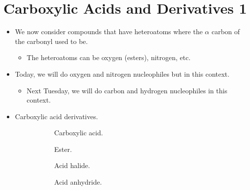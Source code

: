 \documentclass[../notes.tex]{subfiles}
\begin{document}
\section{Carboxylic Acids and Derivatives 1}
\begin{itemize}
    \item {}We now consider compounds that have heteroatoms where the $\alpha$ carbon of the carbonyl used to be.
    \begin{itemize}
        \item The heteroatoms can be oxygen (esters), nitrogen, etc.
    \end{itemize}
    \item Today, we will do oxygen and nitrogen nucleophiles but in this context.
    \begin{itemize}
        \item Next Tuesday, we will do carbon and hydrogen nucleophiles in this context.
    \end{itemize}
    \item Carboxylic acid derivatives.
    \begin{figure}[H]
        \centering
        \footnotesize
        \begin{subfigure}[b]{0.19\linewidth}
            \centering
            \caption{Carboxylic acid.}
            \label{fig:carboxylicAcidDerivativesa}
        \end{subfigure}
        \begin{subfigure}[b]{0.19\linewidth}
            \centering
            \caption{Ester.}
            \label{fig:carboxylicAcidDerivativesb}
        \end{subfigure}
        \begin{subfigure}[b]{0.19\linewidth}
            \centering
            \caption{Acid halide.}
            \label{fig:carboxylicAcidDerivativesc}
        \end{subfigure}
        \begin{subfigure}[b]{0.19\linewidth}
            \centering
            \caption{Acid anhydride.}
            \label{fig:carboxylicAcidDerivativesd}
        \end{subfigure}
        \begin{subfigure}[b]{0.19\linewidth}
            \centering

\end{subfigure}
\end{figure}
\end{itemize}
\end{document}
